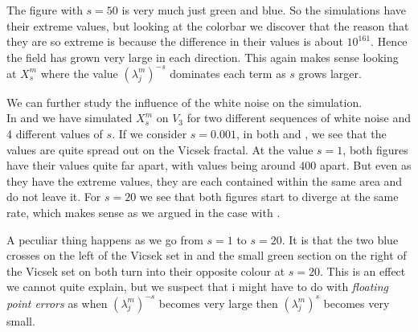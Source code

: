 The figure with $s = 50$ is very much just green and blue. So the simulations have their extreme values, but looking at the colorbar we discover that the reason that they are so extreme is because the difference in their values is about $10^{161}$. Hence the field has grown very large in each direction. This again makes sense looking at $X_s^{m}$ where the value $(\lambda_j^{m})^{-s}$ dominates each term as $s$ grows larger.

We can further study the influence of the white noise on the simulation. \\
\noi In  and  we have simulated $X_s^{m}$ on $V_3$ for two different sequences of white noise and 4 different values of $s$. If we consider $s = 0.001$, in both  and , we see that the values are quite spread out on the Vicsek fractal. At the value $s = 1$, both figures have their values quite far apart, with values being around $400$ apart. But even as they have the extreme values, they are each contained within the same area and do not leave it. For $s = 20$ we see that both figures start to diverge at the same rate, which makes sense as we argued in the case with .

A peculiar thing happens as we go from $s = 1$ to $s = 20$. It is that the two blue crosses on the left of the Vicsek set in  and the small green section on the right of the Vicsek set on  both turn into their opposite colour at $s = 20$. This is an effect we cannot quite explain, but we suspect that i might have to do with \emph{floating point errors} as when $\left(\lambda_j^{m}\right)^{-s}$ becomes very large then $\left(\lambda_j^{m}\right)^{s}$ becomes very small.

